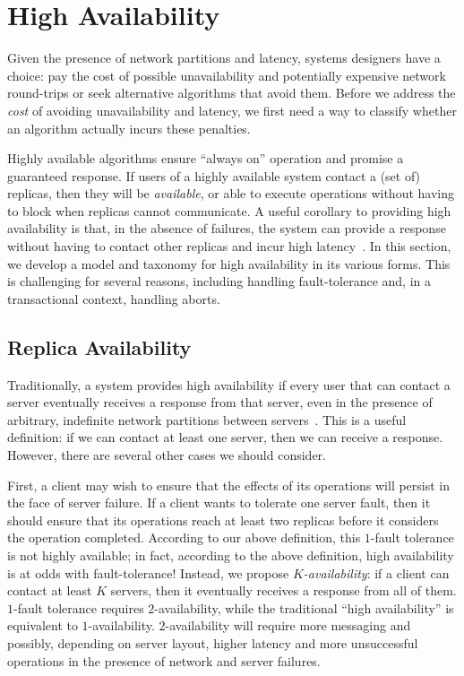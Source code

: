 
\section{High Availability}
\label{sec:availability}

Given the presence of network partitions and latency, systems
designers have a choice: pay the cost of possible unavailability and
potentially expensive network round-trips or seek alternative
algorithms that avoid them. Before we address the \textit{cost} of
avoiding unavailability and latency, we first need a way to classify
whether an algorithm actually incurs these penalties.

Highly available algorithms ensure ``always on'' operation and promise
a guaranteed response. If users of a highly available system contact a
(set of) replicas, then they will be \textit{available}, or able to
execute operations without having to block when replicas cannot
communicate. A useful corollary to providing high availability is
that, in the absence of failures, the system can provide a response
without having to contact other replicas and incur high
latency~\cite{abadi-pacelc}. In this section, we develop a model and
taxonomy for high availability in its various forms. This is
challenging for several reasons, including handling fault-tolerance
and, in a transactional context, handling aborts.

\subsection{Replica Availability}

Traditionally, a system provides high availability if every user that
can contact a server eventually receives a response from that server,
even in the presence of arbitrary, indefinite network partitions
between servers~\cite{gilbert-cap}. This is a useful definition: if we
can contact at least one server, then we can receive a
response. However, there are several other cases we should consider.

First, a client may wish to ensure that the effects of its operations
will persist in the face of server failure. If a client wants to
tolerate one server fault, then it should ensure that its operations
reach at least two replicas before it considers the operation
completed. According to our above definition, this $1$-fault tolerance
is not highly available; in fact, according to the above definition,
high availability is at odds with fault-tolerance! Instead, we propose
\textit{$K$-availability}: if a client can contact at least $K$
servers, then it eventually receives a response from all of
them. $1$-fault tolerance requires $2$-availability, while the
traditional ``high availability'' is equivalent to
$1$-availability. $2$-availability will require more messaging and
possibly, depending on server layout, higher latency and more
unsuccessful operations in the presence of network and server
failures.

